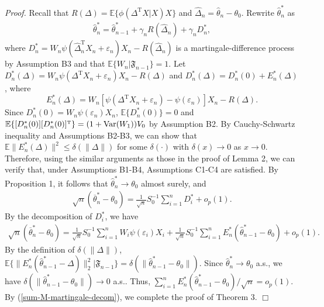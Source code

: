 \documentclass[twoside,11pt]{article}
\def\Var{\mathop{\rm Var}}
\def\trans{^{ \mathrm{\scriptscriptstyle T} }}
\def\wh{\widehat}
\def\ol{\overline}
\begin{document}
{\it Proof.} Recall that $R(\Delta)=\mathbb{E}\{\phi(\Delta\trans X|X)X\}$ and $\wh{\Delta}_{n}=\wh{\theta}_{n}-\theta_0$. Rewrite $\wh{\theta}^*_n$ as
\begin{eqnarray}\label{SGD-wt-rewrite}
\wh{\theta}^*_n = \wh{\theta}^*_{n-1}+\gamma_n R(\wh{\Delta}_{n})+\gamma_n D^*_n,\label{SGD-M-wt-rewrite}
\end{eqnarray}
where $D^*_n=W_n\psi(\wh{\Delta}_{n}\trans X_n + \varepsilon_n)X_n-R(\wh{\Delta}_{n})$ is a martingale-difference process
by Assumption B3 and that $\mathbb{E}\{W_n|\mathfrak{F}_{n-1}\}=1$.
Let $D^*_n(\Delta)=W_n\psi\left(\Delta\trans X_n + \varepsilon_n\right)X_n-R(\Delta)$ and $D^*_n(\Delta)=D^*_n(0)+E^*_n(\Delta)$, where
\begin{equation}
E^*_n(\Delta)=W_n\left[\psi(\Delta\trans X_n+\varepsilon_n)-\psi(\varepsilon_n)\right]X_n-R(\Delta).
\end{equation}
Since $D^*_n(0)=W_n\psi(\varepsilon_n)X_n$, $\mathbb{E}\{D^*_n(0)\}=0$ and $\mathbb{E}\{[D^*_n(0)][D^*_n(0)]\trans\}=(1+\Var(W_1))V_0$ by Assumption B2. By Cauchy-Schwartz inequality and Assumptions B2-B3, we can show that $\mathbb{E}\|E^*_n(\Delta)\|^2\leq \delta(\|\Delta\|)$ for some $\delta(\cdot)$ with $\delta(x)\rightarrow 0$ as $x\rightarrow 0$.  Therefore, using the similar arguments as those in the proof of Lemma 2, we can verify that, under Assumptions B1-B4, Assumptions  C1-C4 are satisfied. By Proposition 1, it follows that $\wh{\theta}^*_n\rightarrow\theta_0$ almost surely, and
\begin{eqnarray}\label{sum-M-martingale}
\sqrt{n}(\ol{\theta}_n^*-\theta_0)=\frac{1}{\sqrt{n}}S_0^{-1}\sum_{i=1}^n D_i^*+ o_p(1).
\end{eqnarray}
By the decomposition of $D_i^*$, we have
\begin{eqnarray}\label{sum-M-martingale-decom}
\sqrt{n}(\ol{\theta}_n^*-\theta_0)=\frac{1}{\sqrt{n}}S_0^{-1}\sum_{i=1}^n W_i \psi(\varepsilon_i)X_i+\frac{1}{\sqrt{n}}S_0^{-1}\sum_{i=1}^n E^*_n(\wh{\theta}^*_{n-1}-\theta_0)+o_p(1).
\end{eqnarray}
By the definition of $\delta(\|\Delta\|)$,  $\mathbb{E}\{\|E^*_n(\wh{\theta}^*_{n-1}-\Delta)\|_2^2|\mathfrak{F}_{n-1}\}=\delta(\|\wh{\theta}^*_{n-1}-\theta_0\|)$.
Since $\wh{\theta}^*_n\rightarrow\theta_0$ a.s., we have $\delta(\|\wh{\theta}^*_{n-1}-\theta_0\|)\rightarrow 0$ a.s.. Thus, $\sum_{i=1}^n E^*_n(\wh{\theta}^*_{n-1}-\theta_0)/\sqrt{n}=o_p(1)$. By (\ref{sum-M-martingale-decom}), we complete the proof of Theorem 3. $\Box$
\end{document}
